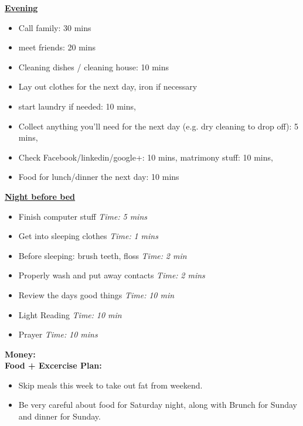 \documentclass[11pt]{article}
\newcommand{\timeEst}[1]{\textit{Time:} \textit{#1}}
\begin{document}
{                \underline{\textbf{Evening}}
                \begin{itemize}
                  \tiny \item \tiny Call family: 30 mins
                \item \tiny meet friends: 20 mins
                \item \tiny Cleaning dishes / cleaning house: 10 mins
                \item \tiny Lay out clothes for the next day, iron if necessary
                \item \tiny start laundry if needed: 10 mins,
                \item \tiny Collect anything you’ll need for the next day (e.g. dry cleaning to drop off): 5 mins,
                \item \tiny Check Facebook/linkedin/google+: 10 mins, matrimony stuff: 10 mins,
                \item \tiny Food for lunch/dinner the next day: 10 mins
                \end{itemize}
                
                \underline{\textbf{Night before bed}}
                \begin{itemize}
                  \tiny \item \tiny Finish computer stuff \timeEst{5 mins}
                \item \tiny Get into sleeping clothes \timeEst{1 mins}
                \item \tiny Before sleeping: brush teeth, floss \timeEst{ 2 min}
                \item \tiny Properly wash and put away contacts \timeEst{ 2 mins}
                \item \tiny Review the days good things \timeEst{ 10 min}
                \item \tiny Light Reading \timeEst{ 10 min}
                \item \tiny Prayer \timeEst{10 mins}
            \end{itemize} 
            \newpage

            \textbf{Money:} \\ 

            \textbf{Food + Excercise Plan:}\\
            \begin{itemize}
              \tiny \item \tiny Skip meals this week to take out fat from weekend.
            \item \tiny Be very careful about food for Saturday night, along with Brunch for Sunday and dinner for Sunday.
            \end{itemize} 
 
}
\end{document}

